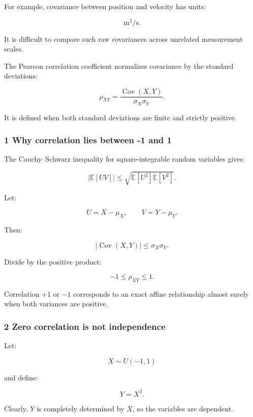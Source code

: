 For example, covariance between position and velocity has units:

\[
 \mathrm{m^2/s}.
\]

It is difficult to compare such raw covariances across unrelated measurement scales.

The Pearson correlation coefficient normalizes covariance by the standard deviations:

\[
 \boxed{ \rho_{XY}= \frac{ \operatorname{Cov}(X,Y) }{ \sigma_X\sigma_Y } }.
\]

It is defined when both standard deviations are finite and strictly positive.

\subsubsection{1 Why correlation lies between -1 and 1}\label{02-foundations-ii-ch023-why-correlation-lies-between--1-and-1}

\hypertarget{02-foundations-ii-ch023-why-correlation-lies-between--1-and-1}{}

The Cauchy--Schwarz inequality for square-integrable random variables gives:

\[
 |\mathbb E[UV]| \le \sqrt{\mathbb E[U^2]\mathbb E[V^2]}.
\]

Let:

\[
 U=X-\mu_X, \qquad V=Y-\mu_Y.
\]

Then:

\[
 |\operatorname{Cov}(X,Y)| \le \sigma_X\sigma_Y.
\]

Divide by the positive product:

\[
 \boxed{ -1\le\rho_{XY}\le1 }.
\]

Correlation \(+1\) or \(-1\) corresponds to an exact affine relationship almost surely when both variances are positive.

\subsubsection{2 Zero correlation is not independence}\label{02-foundations-ii-ch023-zero-correlation-is-not-independence}

\hypertarget{02-foundations-ii-ch023-zero-correlation-is-not-independence}{}

Let:

\[
 X\sim U(-1,1)
\]

and define:

\[
 Y=X^2.
\]

Clearly, \(Y\) is completely determined by \(X\), so the variables are dependent.

